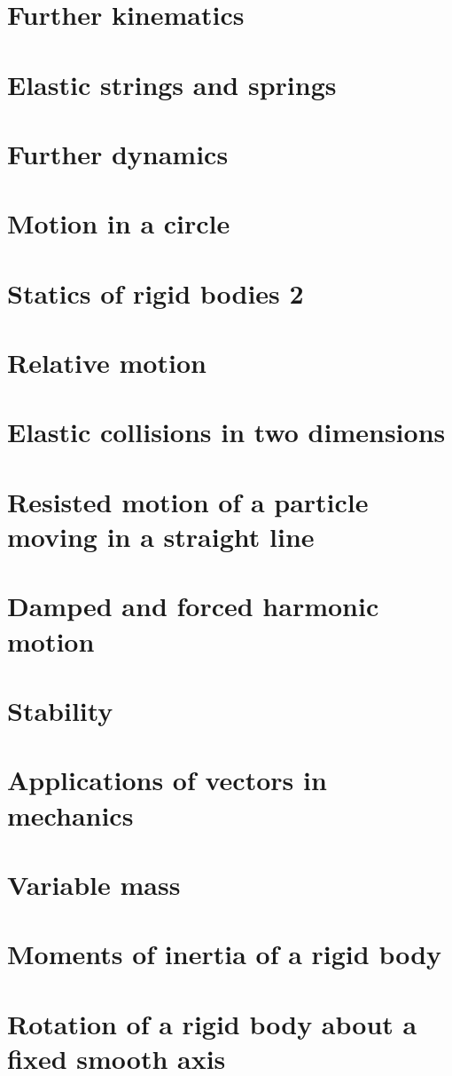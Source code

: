 \documentclass[a4paper]{article}
\begin{document}
\section{Further kinematics}

\section{Elastic strings and springs}

\section{Further dynamics}

\section{Motion in a circle}

\section{Statics of rigid bodies 2}

\section{Relative motion}

\section{Elastic collisions in two dimensions}

\section{Resisted motion of a particle moving in a straight line}

\section{Damped and forced harmonic motion}

\section{Stability}

\section{Applications of vectors in mechanics}

\section{Variable mass}

\section{Moments of inertia of a rigid body}

\section{Rotation of a rigid body about a fixed smooth axis}




\printindex
\end{document}
